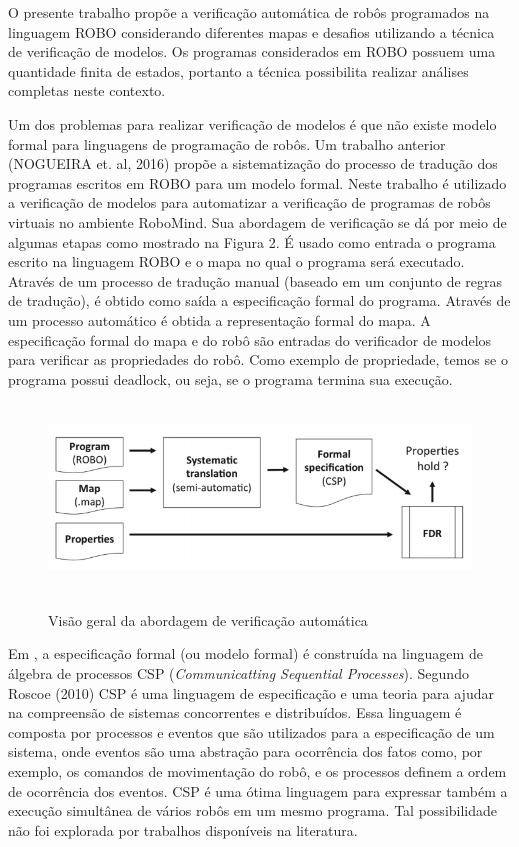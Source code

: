 O presente trabalho propõe a verificação automática de robôs programados na linguagem ROBO considerando diferentes mapas e desafios utilizando a técnica de verificação de modelos. Os programas considerados em ROBO possuem uma quantidade finita de estados, portanto a técnica possibilita realizar análises completas neste contexto.

Um dos problemas para realizar verificação de modelos é que não existe modelo formal para linguagens de programação de robôs. Um trabalho anterior (NOGUEIRA et. al, 2016) propõe a sistematização do processo de tradução dos programas escritos em ROBO para um modelo formal.  Neste trabalho é utilizado a verificação de modelos para automatizar a verificação de programas de robôs virtuais no ambiente RoboMind. Sua abordagem de verificação se dá por meio de algumas etapas como mostrado na Figura 2. É usado como entrada o programa escrito na linguagem ROBO e o mapa no qual o programa será executado. Através de um processo de tradução manual (baseado em um conjunto de regras de tradução), é obtido como saída a especificação formal do programa. Através de um processo automático é obtida a representação formal do mapa. A especificação formal do mapa e do robô são entradas do verificador de modelos para verificar as propriedades do robô. Como exemplo de propriedade, temos se o programa possui deadlock, ou seja, se o programa termina sua execução. 

\begin{figure}[h]
\centering
\caption{Visão geral da abordagem de verificação automática}
\includegraphics[height=5cm]{figuras/approach_workflow.png}
\label{fig:fluxograma}
\end{figure} 

Em \cite{nogueira}, a especificação formal (ou modelo formal) é construída na linguagem de álgebra de processos CSP (\textit{Communicatting Sequential Processes}). Segundo Roscoe (2010) CSP é uma linguagem de especificação e uma teoria para ajudar na compreensão de sistemas concorrentes e distribuídos. Essa linguagem é composta por processos e eventos que são utilizados para a especificação de um sistema, onde eventos são uma abstração para ocorrência dos fatos como, por exemplo, os comandos de movimentação do robô, e os processos definem a ordem de ocorrência dos eventos. CSP é uma ótima linguagem para expressar também a execução simultânea de vários robôs em um mesmo programa. Tal possibilidade não foi explorada por trabalhos disponíveis na literatura.

